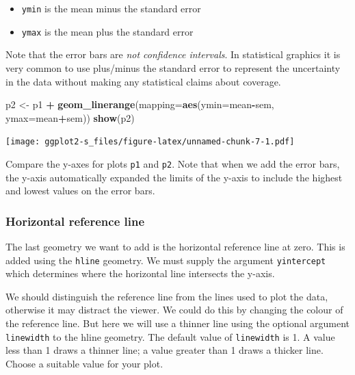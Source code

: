\documentclass[
]{book}
\newenvironment{Shaded}{\begin{snugshade}}{\end{snugshade}}
\newcommand{\AttributeTok}[1]{\textcolor[rgb]{0.13,0.29,0.53}{#1}}
\newcommand{\FunctionTok}[1]{\textcolor[rgb]{0.13,0.29,0.53}{\textbf{#1}}}
\newcommand{\NormalTok}[1]{#1}
\newcommand{\OtherTok}[1]{\textcolor[rgb]{0.56,0.35,0.01}{#1}}
\newcommand{\SpecialCharTok}[1]{\textcolor[rgb]{0.81,0.36,0.00}{\textbf{#1}}}
\providecommand{\tightlist}{%
  \setlength{\itemsep}{0pt}\setlength{\parskip}{0pt}}
\begin{document}
\begin{itemize}
\tightlist
\item
  \texttt{ymin} is the mean minus the standard error
\item
  \texttt{ymax} is the mean plus the standard error
\end{itemize}

Note that the error bars are \emph{not confidence intervals}. In statistical graphics it is very common to use plus/minus the standard error to represent the uncertainty in the data without making any statistical claims about coverage.

\begin{Shaded}
\begin{Highlighting}[]
\NormalTok{p2 }\OtherTok{\textless{}{-}}\NormalTok{ p1 }\SpecialCharTok{+} \FunctionTok{geom\_linerange}\NormalTok{(}\AttributeTok{mapping=}\FunctionTok{aes}\NormalTok{(}\AttributeTok{ymin=}\NormalTok{mean}\SpecialCharTok{{-}}\NormalTok{sem, }\AttributeTok{ymax=}\NormalTok{mean}\SpecialCharTok{+}\NormalTok{sem))}
\FunctionTok{show}\NormalTok{(p2)}
\end{Highlighting}
\end{Shaded}

\texttt{[image: ggplot2-s\_files/figure-latex/unnamed-chunk-7-1.pdf]}

Compare the y-axes for plots \texttt{p1} and \texttt{p2}. Note that when we add the error bars, the y-axis automatically expanded the limits of the y-axis to include the highest and lowest values on the error bars.

\subsubsection{Horizontal reference line}\label{horizontal-reference-line}

The last geometry we want to add is the horizontal reference line at zero. This is added using the \texttt{hline} geometry. We must supply the argument \texttt{yintercept} which determines where the horizontal line intersects the y-axis.

We should distinguish the reference line from the lines used to plot the data, otherwise it may distract the viewer. We could do this by changing the colour of the reference line. But here we will use a thinner line using the optional argument \texttt{linewidth} to the hline geometry. The default value of \texttt{linewidth} is 1. A value less than 1 draws a thinner line; a value greater than 1 draws a thicker line. Choose a suitable value for your plot.
\end{document}
